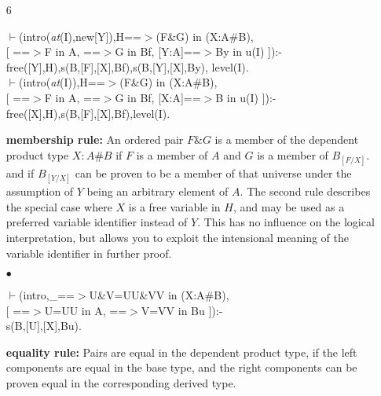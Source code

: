 \documentclass[11pt]{report}
\begin{document}
\begin{enumerate}
 \item[6]
\begin{sf}\begin{tabbing}
$\vdash$(intro(\mbox{\it at}(I),new[Y]),H==$>$(F\&G) in (X:A\#B), \\[-0.15ex]
\hspace{2em}[ ==$>$F in A, ==$>$G in Bf, [Y:A]==$>$By in u(I) ]):-\\[-0.15ex]
\hspace{2em}free([Y],H),s(B,[F],[X],Bf),s(B,[Y],[X],By), level(I).\\[-0.15ex]
$\vdash$(intro(\mbox{\it at}(I)),H==$>$(F\&G) in (X:A\#B),\\[-0.15ex]
\hspace{2em}[ ==$>$F in A, ==$>$G in Bf, [X:A]==$>$B in u(I) ]):-\\[-0.15ex]
\hspace{2em}free([X],H),s(B,[F],[X],Bf),level(I).
\end{tabbing}\end{sf}

 {\bf membership rule:}  
 An ordered pair $F\&G$ is a member of the dependent product type
 $X:A\#B$ if $F$ is a member of $A$ and $G$ is a member of $B_{[F/X]}$.
 and if $B_{[Y/X]}$ can be proven to be a member of that universe
 under the assumption of $Y$ being an arbitrary element of $A$.
 The second rule describes the special case
 where $X$ is a free variable in $H$, and may be used as a
 preferred variable identifier instead of $Y$. This has no
 influence on the logical interpretation, but allows you to
 exploit the intensional meaning of the variable identifier
 in further proof.
  
 \item[$\bullet$]
\begin{sf}\begin{tabbing}
$\vdash$(intro,\_\hspace{0.1em}==$>$U\&V=UU\&VV in (X:A\#B),\\[-0.15ex]
\hspace{2em}[ ==$>$U=UU in A, ==$>$V=VV in Bu ]):-\\[-0.15ex]
\hspace{2em}s(B,[U],[X],Bu).
\end{tabbing}\end{sf}

 {\bf equality rule:}
 Pairs are equal in the dependent product type, 
 if the left components are equal in the base type,
 and the right components
 can be proven equal in the corresponding derived type.
 \end{enumerate}
  
\end{document}

